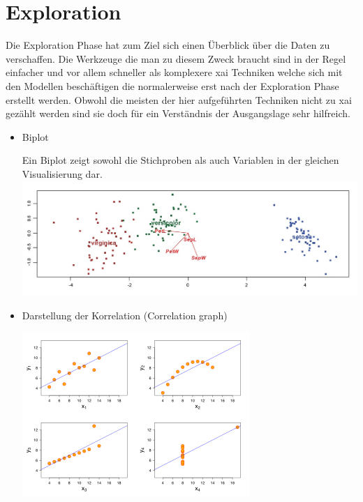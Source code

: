 \documentclass[
  12pt, %
  a4paper, %
  oneside, %
  openany, 
  numbers=noenddot, %
  BCOR=5mm, %
  parskip=half*, %
  thesis, %
]{bfhbook}
\begin{document}
\section{Exploration}
Die Exploration Phase hat zum Ziel sich einen Überblick über die Daten zu verschaffen. Die Werkzeuge die man zu diesem Zweck braucht sind in der Regel einfacher und vor allem schneller als komplexere \Gls{xai} Techniken welche sich mit den Modellen beschäftigen die normalerweise erst nach der Exploration Phase erstellt werden. Obwohl die meisten der hier aufgeführten Techniken nicht zu \acrshort{xai} gezählt werden sind sie doch für ein Verständnis der Ausgangslage sehr hilfreich.
\begin{itemize}
	\item Biplot
	
	\begin{minipage}{\linewidth}
		Ein Biplot zeigt sowohl die Stichproben als auch Variablen in der gleichen Visualisierung dar.
            \includegraphics[width=0.7\linewidth]{Bilder/IrisDAbiplot.jpg}
        \end{minipage}
        
	\item Darstellung der Korrelation (Correlation graph)
	
	\begin{minipage}{\linewidth}
            \includegraphics[width=0.6\linewidth]{Bilder/325px-Anscombe's_quartet_3.png}
        \end{minipage}
        

\end{itemize}
\end{document}
